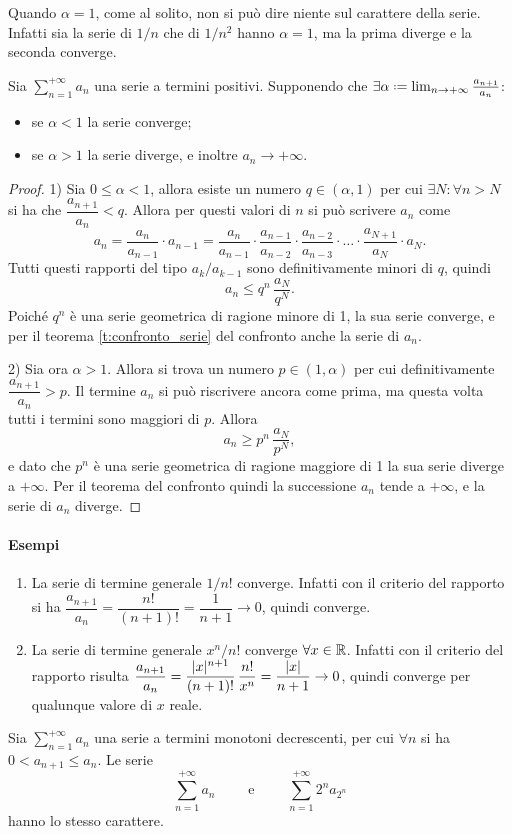 Quando $\alpha=1$, come al solito, non si può dire niente sul carattere della serie. Infatti sia la serie di $1/n$ che di $1/n^2$ hanno $\alpha=1$, ma la prima diverge e la seconda converge.
\begin{teorema}
\label{t:criterio_rapporto_serie}
Sia $\sum_{n=1}^{+\infty}a_n$ una serie a termini positivi. Supponendo che $\exists\alpha\defeq\lim_{n\to+\infty}\frac{a_{n+1}}{a_n}$:
\begin{itemize}
\item se $\alpha<1$ la serie converge;
\item se $\alpha>1$ la serie diverge, e inoltre $a_n\to+\infty$.
\end{itemize}
\end{teorema}
\begin{proof}
1) Sia $0\leq\alpha<1$, allora esiste un numero $q\in(\alpha,1)$ per cui $\exists N\colon\forall n>N$ si ha che $\dfrac{a_{n+1}}{a_n}<q$. Allora per questi valori di $n$ si può scrivere $a_n$ come
\[
a_n=\frac{a_n}{a_{n-1}}\cdot a_{n-1}=\frac{a_n}{a_{n-1}}\cdot\frac{a_{n-1}}{a_{n-2}}\cdot\frac{a_{n-2}}{a_{n-3}}\cdot\dots\cdot\frac{a_{N+1}}{a_N}\cdot a_N.
\]
Tutti questi rapporti del tipo $a_k/a_{k-1}$ sono definitivamente minori di $q$, quindi
\[
a_n\leq q^n\,\frac{a_N}{q^N}.
\]
Poiché $q^n$ è una serie geometrica di ragione minore di 1, la sua serie converge, e per il teorema \ref{t:confronto_serie} del confronto anche la serie di $a_n$.

2) Sia ora $\alpha>1$. Allora si trova un numero $p\in(1,\alpha)$ per cui definitivamente $\dfrac{a_{n+1}}{a_n}>p$. Il termine $a_n$ si può riscrivere ancora come prima, ma questa volta tutti i termini sono maggiori di $p$. Allora
\[
a_n\geq p^n\,\frac{a_N}{p^N},
\]
e dato che $p^n$ è una serie geometrica di ragione maggiore di 1 la sua serie diverge a $+\infty$. Per il teorema del confronto quindi la successione $a_n$ tende a $+\infty$, e la serie di $a_n$ diverge.
\end{proof}
\paragraph{Esempi}
\begin{enumerate}
\item La serie di termine generale $1/n!$ converge. Infatti con il criterio del rapporto si ha $\dfrac{a_{n+1}}{a_n}=\dfrac{n!}{(n+1)!}=\dfrac1{n+1}\to 0$, quindi converge.
\item La serie di termine generale $x^n/n!$ converge $\forall x\in\mathbb{R}$. Infatti con il criterio del rapporto risulta $\dfrac{a_{n+1}}{a_n}=\dfrac{\lvert x\rvert^{n+1}}{(n+1)!}\,\dfrac{n!}{x^n}=\dfrac{\lvert x\rvert}{n+1}\to 0$, quindi converge per qualunque valore di $x$ reale.
\end{enumerate}
\begin{teorema}
Sia $\sum_{n=1}^{+\infty}a_n$ una serie a termini monotoni decrescenti, per cui $\forall n$ si ha $0<a_{n+1}\leq a_n$. Le serie
\[
\sum_{n=1}^{+\infty}a_n\qquad\text{ e }\qquad\sum_{n=1}^{+\infty}2^na_{2^n}
\]
hanno lo stesso carattere.
\end{teorema}
